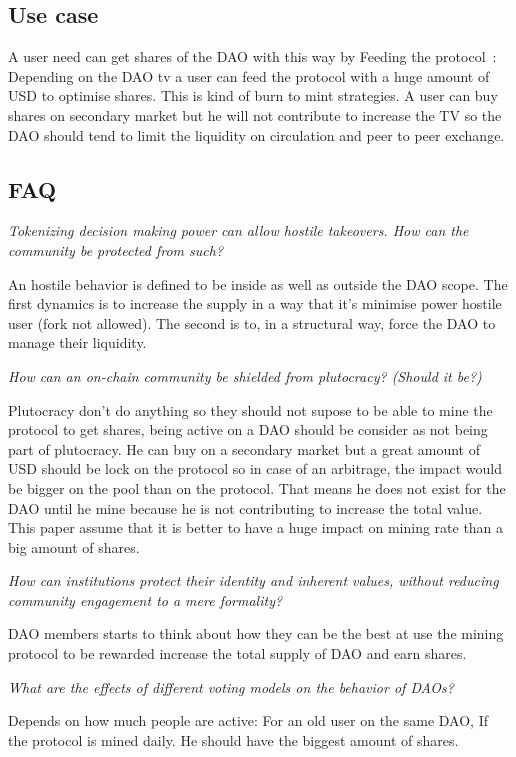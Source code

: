 \documentclass{article}
\begin{document}
\begin{multicols}{2}[]
\subsection{Use case}
A user need can get shares of the DAO with this way by Feeding the protocol : 
Depending on the DAO tv a user can feed the protocol with a huge amount of USD to optimise shares. This is kind of burn to mint strategies.  
A user can buy shares on secondary market but he will not contribute to increase the TV so the DAO should tend to limit the liquidity on circulation and peer to peer exchange.
\subsection{FAQ}
\emph{Tokenizing decision making power can allow hostile takeovers. How can the community be protected from such?}

An hostile behavior is defined to be inside as well as outside the DAO scope. The first dynamics is to increase the supply in a way that it’s minimise power hostile user (fork not allowed). The second is to, in a structural way, force the DAO to manage their liquidity.

\emph{How can an on-chain community be shielded from plutocracy? (Should it be?)}

Plutocracy don't do anything so they should not supose to be able to mine the protocol to get shares, being active on a DAO should be consider as not being part of plutocracy. 
He can buy on a secondary market but a great amount of USD should be lock on the protocol so in case of an arbitrage, the impact would be bigger on the pool than on the protocol. That means he does not exist for the DAO until he mine because he is not contributing to increase the total value. This paper assume that it is better to have a huge impact on mining rate than a big amount of shares.  

\emph{How can institutions protect their identity and inherent values, without reducing community engagement to a mere formality?}

DAO members starts to think about how they can be the best at use the mining protocol to be rewarded increase the total supply of DAO and earn shares.

\emph{What are the effects of different voting models on the behavior of DAOs?}

Depends on how much people are active: For an old user on the same DAO, If the protocol is mined daily. He should have the biggest amount of shares.


\end{multicols}
\end{document}
